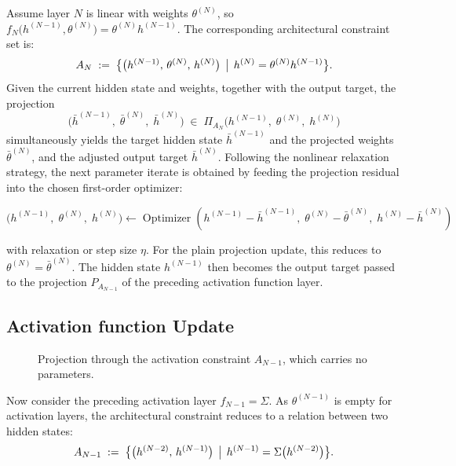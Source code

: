 \documentclass{article}
\begin{document}
Assume layer $N$ is linear with weights $\theta^{(N)}$, so $f_N\bigl(h^{(N-1)},\theta^{(N)}\bigr) = \theta^{(N)} h^{(N-1)}$. The corresponding architectural constraint set is:
\begin{equation}
A_{N} \;:=\; \bigl\{\bigl(h^{(N-1)},\, \theta^{(N)},\, h^{(N)}\bigr) \,\bigm|\, h^{(N)} = \theta^{(N)} h^{(N-1)} \bigr\}.
\end{equation}
Given the current hidden state and weights, together with the output target, the projection
\begin{equation}
\bigl(\bar{h}^{(N-1)},\; \bar{\theta}^{(N)},\; \bar{h}^{(N)}\bigr) \;\in\; \Pi_{A_{N}}\!\bigl(h^{(N-1)},\; \theta^{(N)},\; h^{(N)}\bigr)
\end{equation}
simultaneously yields the target hidden state $\bar{h}^{(N-1)}$ and the projected weights $\bar{\theta}^{(N)}$, and the adjusted output target $\bar{h}^{(N)}$. Following the nonlinear relaxation strategy, the next parameter iterate is obtained by feeding the projection residual into the chosen first-order optimizer:

\begin{equation}
\bigl(h^{(N-1)},\;\theta^{(N)},\; h^{(N)}\bigr) \gets \operatorname{Optimizer}\!\left( {h}^{(N-1)} - \bar h^{(N-1)},\; {\theta}^{(N)} - \bar \theta^{(N)},\; {h}^{(N)} - \bar h^{(N)} \right)
\end{equation}

with relaxation or step size $\eta$. For the plain projection update, this reduces to $\theta^{(N)} = \bar{\theta}^{(N)}$. The hidden state $h^{(N-1)}$ then becomes the output target passed to the projection $P_{A_{N-1}}$ of the preceding activation function layer.

\subsection{Activation function Update}
\begin{figure}[htbp]
\centering
\resizebox{0.78\textwidth}{!}{%

}
\caption{Projection through the activation constraint $A_{N-1}$, which carries no
parameters.}
\label{fig:next_back_prop_mid}
\end{figure}
 
Now consider the preceding activation layer $f_{N-1} = \Sigma$. As $\theta^{(N-1)}$ is empty for activation layers, the architectural constraint reduces to a relation between two hidden states:
\[
A_{N-1} \;:=\; \bigl\{\bigl(h^{(N-2)},\, h^{(N-1)}\bigr) \,\bigm|\,
h^{(N-1)} = \Sigma\bigl(h^{(N-2)}\bigr) \bigr\}.
\]
\end{document}
